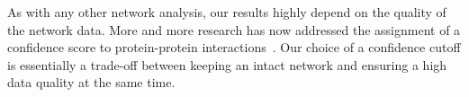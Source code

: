 \begin{itemize}
As with any other network analysis, our results highly depend on the quality of
the network data. More and more research has now addressed the assignment of
a confidence score to protein-protein interactions~\citep{Kamburov2012}.
Our choice of a confidence cutoff is essentially a trade-off between keeping
an intact network and ensuring a high data quality at the same time.





\end{itemize}








